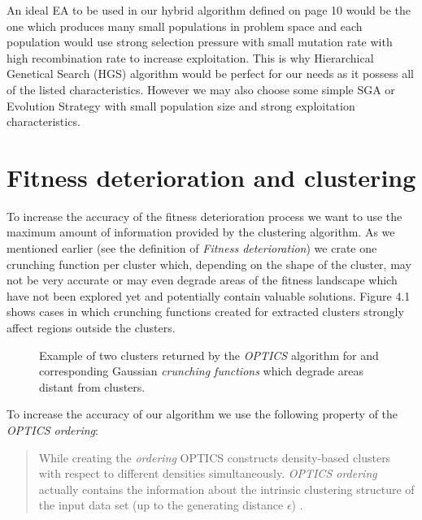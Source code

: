An ideal EA to be used in our hybrid algorithm defined on page 10
would be the one which produces many small populations in problem space and
each population would use strong selection pressure with small mutation rate
with high recombination rate to increase exploitation. This is why Hierarchical 
Genetical Search (HGS) algorithm would be perfect for our needs as it possess
all of the listed characteristics. However we may also choose some simple 
SGA or Evolution Strategy with small population size and strong exploitation
characteristics.
 

\section{Fitness deterioration and clustering}

To increase the accuracy of the fitness deterioration process 
we want to use the maximum amount of information provided by the clustering
algorithm. As we mentioned earlier (see the definition of \textit{Fitness
deterioration}) we crate one crunching function per cluster which, depending
on the shape of the cluster, may not be very accurate or may even degrade areas
of the fitness landscape which have not been explored yet and potentially
contain valuable solutions. Figure 4.1 shows cases in which crunching functions
created for extracted clusters strongly affect regions outside the clusters.

\begin{figure}
  \centering
  \caption{Example of two clusters returned by the \textit{OPTICS} algorithm
  for and corresponding Gaussian \textit{crunching functions} which degrade
  areas distant from clusters.}
  \label{clusterDensity}
\end{figure}
 
 

To increase the accuracy of our algorithm
we use the following property of the \textit{OPTICS ordering}:

\begin{quotation}
While creating the \textit{ordering} OPTICS constructs density-based clusters
with respect to different densities simultaneously. \textit{OPTICS ordering}
actually contains the information about the intrinsic clustering structure of
the input data set (up to the generating distance $\epsilon$) \cite{optics}.
\end{quotation}

